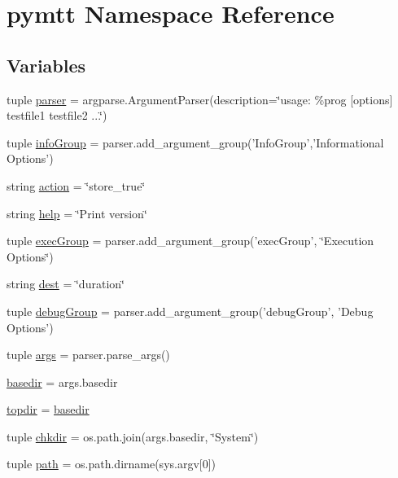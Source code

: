 \hypertarget{namespacepymtt}{\section{pymtt Namespace Reference}
\label{namespacepymtt}
}
\subsection*{Variables}
\begin{DoxyCompactItemize}
\item 
tuple \hyperlink{namespacepymtt_a95d54fdad48aac280be9d57cf81dee68}{parser} = argparse.\-Argument\-Parser(description=\char`\"{}usage\-: \%prog \mbox{[}options\mbox{]} testfile1 testfile2 ...\char`\"{})
\item 
tuple \hyperlink{namespacepymtt_a99ad2929ecc4e17f97670bed44f08c35}{info\-Group} = parser.\-add\-\_\-argument\-\_\-group('Info\-Group','Informational Options')
\item 
string \hyperlink{namespacepymtt_a5ee564a034624d925bb8dc823d11c522}{action} = \char`\"{}store\-\_\-true\char`\"{}
\item 
string \hyperlink{namespacepymtt_a21e88c39af91deb569da20633d245b09}{help} = \char`\"{}Print version\char`\"{}
\item 
tuple \hyperlink{namespacepymtt_a0f52dbd5d46583e466305a708dea64a1}{exec\-Group} = parser.\-add\-\_\-argument\-\_\-group('exec\-Group', \char`\"{}Execution Options\char`\"{})
\item 
string \hyperlink{namespacepymtt_a9ecea46ee6082edb9bbdd8393829e18e}{dest} = \char`\"{}duration\char`\"{}
\item 
tuple \hyperlink{namespacepymtt_af066a010075617c13a5595243ceb9041}{debug\-Group} = parser.\-add\-\_\-argument\-\_\-group('debug\-Group', 'Debug Options')
\item 
tuple \hyperlink{namespacepymtt_adec79fec8fbc6630a3a485916f342683}{args} = parser.\-parse\-\_\-args()
\item 
\hyperlink{namespacepymtt_a968aa7c33a2106380483390a0fa2a045}{basedir} = args.\-basedir
\item 
\hyperlink{namespacepymtt_ac564eaf8be3f93d5dd5703b3d919902b}{topdir} = \hyperlink{namespacepymtt_a968aa7c33a2106380483390a0fa2a045}{basedir}
\item 
tuple \hyperlink{namespacepymtt_a574a50dd90d5a2f46fcb0e27b43a7af9}{chkdir} = os.\-path.\-join(args.\-basedir, \char`\"{}System\char`\"{})
\item 
tuple \hyperlink{namespacepymtt_a79ea4ff472e24c5d543c6a30968b21e6}{path} = os.\-path.\-dirname(sys.\-argv\mbox{[}0\mbox{]})

\end{DoxyCompactItemize}
